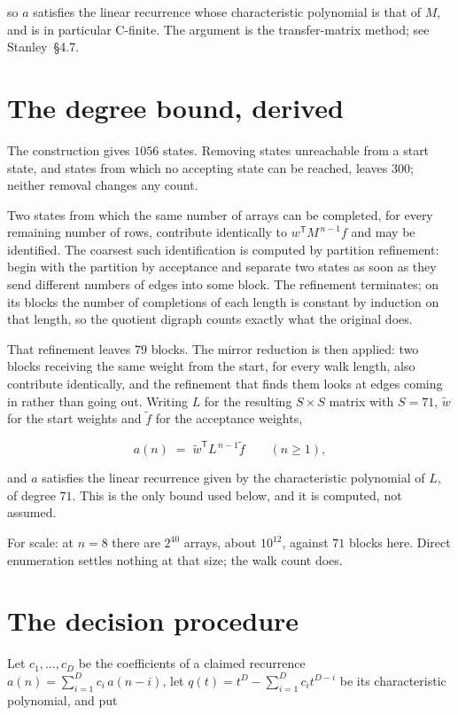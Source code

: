 \documentclass[11pt]{article}
\theoremstyle{definition}
\begin{document}
so $a$ satisfies the linear recurrence whose characteristic polynomial is that of $M$, and is in particular C-finite. The argument is the transfer-matrix method; see Stanley~\S4.7.

\section{The degree bound, derived}

The construction gives $1056$ states. Removing states unreachable from a start state, and states from which no accepting state can be reached, leaves $300$; neither removal changes any count.

Two states from which the same number of arrays can be completed, for every remaining number of rows, contribute identically to $w^{\mathsf T}M^{\,n-1}f$ and may be identified. The coarsest such identification is computed by partition refinement: begin with the partition by acceptance and separate two states as soon as they send different numbers of edges into some block. The refinement terminates; on its blocks the number of completions of each length is constant by induction on that length, so the quotient digraph counts exactly what the original does.

That refinement leaves $79$ blocks. The mirror reduction is then applied: two blocks receiving the same weight from the start, for every walk length, also contribute identically, and the refinement that finds them looks at edges coming in rather than going out. Writing $L$ for the resulting $S \times S$ matrix with $S = 71$, $\tilde w$ for the start weights and $\tilde f$ for the acceptance weights,

\[a(n) \;=\; \tilde w^{\mathsf T} L^{\,n-1} \tilde f \qquad (n \ge 1),\]

and $a$ satisfies the linear recurrence given by the characteristic polynomial of $L$, of degree $71$. This is the only bound used below, and it is computed, not assumed.

For scale: at $n = 8$ there are $2^{40}$ arrays, about $10^{12}$, against $71$ blocks here. Direct enumeration settles nothing at that size; the walk count does.

\section{The decision procedure}

Let $c_1,\dots,c_D$ be the coefficients of a claimed recurrence $a(n) = \sum_{i=1}^{D} c_i\,a(n-i)$, let $q(t) = t^{D} - \sum_{i=1}^{D} c_i t^{D-i}$ be its characteristic polynomial, and put
\end{document}
